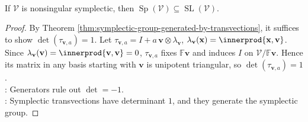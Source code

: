 \begin{proposition} \label{prop:symplectic-transformations-have-determinant-one} \\
If $\mathcal{V}$ is nonsingular symplectic, then $\operatorname{Sp}(\mathcal{V})\subseteq\operatorname{SL}(\mathcal{V})$.
\begin{proof}
By Theorem \ref{thm:symplectic-group-generated-by-transvections}, it suffices to show $\det(\tau_{\mathbf{v},a})=1$. Let $\tau_{\mathbf{v},a}=I+a\,\mathbf{v}\otimes\lambda_{\mathbf{v}}$, $\lambda_{\mathbf{v}}(\mathbf{x})=\innerprod{\mathbf{x},\mathbf{v}}$.\\
Since $\lambda_{\mathbf{v}}(\mathbf{v})=\innerprod{\mathbf{v},\mathbf{v}}=0$, $\tau_{\mathbf{v},a}$ fixes $\mathbb{F}\mathbf{v}$ and induces $I$ on $\mathcal{V}/\mathbb{F}\mathbf{v}$. Hence its matrix in any basis starting with $\mathbf{v}$ is unipotent triangular, so $\det(\tau_{\mathbf{v},a})=1$.\\
: Generators rule out $\det=-1$.\\
: Symplectic transvections have determinant $1$, and they generate the symplectic group.
\end{proof}
\end{proposition}

